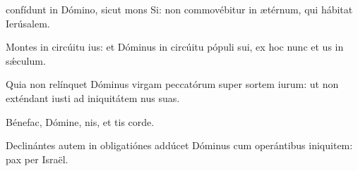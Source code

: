 \item {} confídunt in Dómino, sicut mons Si:\psstar{} non commovébitur in ætérnum, qui hábitat  Ierúsalem.

\item Montes in circúitu ius: \psstar{} et Dóminus in circúitu pópuli sui, ex hoc nunc et us in sǽculum.

\item Quia non relínquet Dóminus virgam peccatórum super sortem iurum:\psstar{} ut non exténdant iusti ad iniquitátem nus suas.

\item Bénefac, Dómine, nis,\psstar{} et tis corde.

\item Declinántes autem in obligatiónes addúcet Dóminus cum operántibus iniquitem:\psstar{} pax per Israël.
